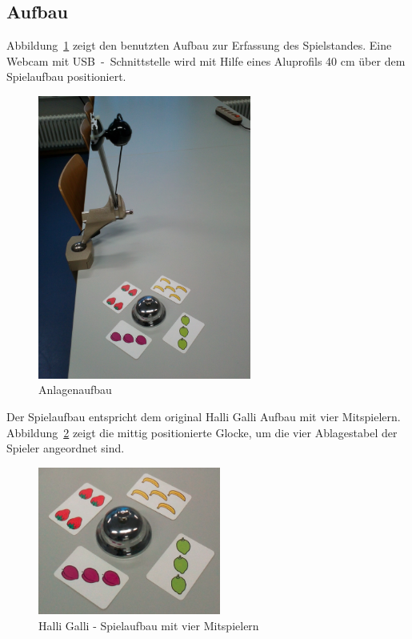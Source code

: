 \subsection{Aufbau}

Abbildung~\ref{fig:Anlage} zeigt den benutzten Aufbau zur Erfassung des Spielstandes. Eine Webcam mit USB~-~Schnittstelle wird mit Hilfe eines Aluprofils 40 cm über dem Spielaufbau positioniert.

\begin{figure}[]
    \centering
    \includegraphics[width=7cm]{Abbildungen/KameraAufbau}
    \caption[Anlage]{Anlagenaufbau}
    \label{fig:Anlage}
\end{figure}

Der Spielaufbau entspricht dem original Halli Galli Aufbau mit vier Mitspielern. Abbildung~\ref{fig:Spielaufbau} zeigt die mittig positionierte Glocke, um die vier Ablagestabel der Spieler angeordnet sind.\\

\begin{figure}[h]
    \centering
    \includegraphics[width=6cm]{Abbildungen/Aufbau4}
    \caption[Spielaufbau]{Halli Galli - Spielaufbau mit vier Mitspielern}
    \label{fig:Spielaufbau}
\end{figure}


